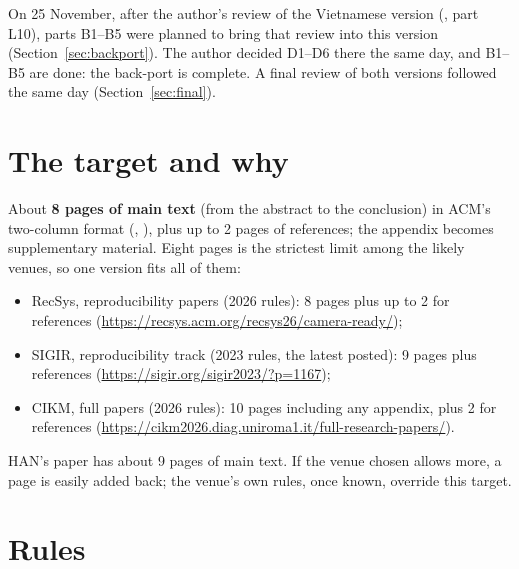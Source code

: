\documentclass[11pt,a4paper]{article}
\DeclareRobustCommand{\code}[1]{\texttt{\detokenize{#1}}}
\begin{document}
On 25 November, after the author's review of the Vietnamese version (\code{paper_v2_vn/}, part
L10), parts B1--B5 were planned to bring that review into this version
(Section~\ref{sec:backport}). The author decided D1--D6 there the same day, and B1--B5 are
done: the back-port is complete. A final review of both versions followed the same day
(Section~\ref{sec:final}).

\section{The target and why}

About \textbf{8 pages of main text} (from the abstract to the conclusion) in ACM's two-column
format (\code{acmart}, \code{sigconf}), plus up to 2 pages of references; the appendix becomes
supplementary material. Eight pages is the strictest limit among the likely venues, so one
version fits all of them:
\begin{itemize}
  \item RecSys, reproducibility papers (2026 rules): 8 pages plus up to 2 for references
        (\url{https://recsys.acm.org/recsys26/camera-ready/});
  \item SIGIR, reproducibility track (2023 rules, the latest posted): 9 pages plus references
        (\url{https://sigir.org/sigir2023/?p=1167});
  \item CIKM, full papers (2026 rules): 10 pages including any appendix, plus 2 for references
        (\url{https://cikm2026.diag.uniroma1.it/full-research-papers/}).
\end{itemize}
HAN's paper has about 9 pages of main text. If the venue chosen allows more, a page is easily
added back; the venue's own rules, once known, override this target.

\section{Rules}
\end{document}
